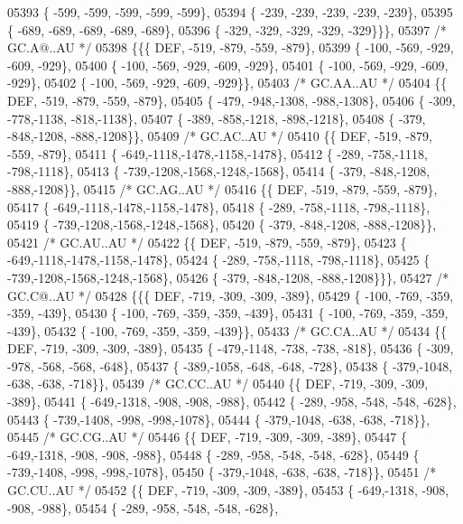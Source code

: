 \begin{DoxyCode}
05393 \{ -599, -599, -599, -599, -599\},
05394 \{ -239, -239, -239, -239, -239\},
05395 \{ -689, -689, -689, -689, -689\},
05396 \{ -329, -329, -329, -329, -329\}\}\},
05397 \textcolor{comment}{/* GC.A@..AU */}
05398 \{\{\{  DEF, -519, -879, -559, -879\},
05399 \{ -100, -569, -929, -609, -929\},
05400 \{ -100, -569, -929, -609, -929\},
05401 \{ -100, -569, -929, -609, -929\},
05402 \{ -100, -569, -929, -609, -929\}\},
05403 \textcolor{comment}{/* GC.AA..AU */}
05404 \{\{  DEF, -519, -879, -559, -879\},
05405 \{ -479, -948,-1308, -988,-1308\},
05406 \{ -309, -778,-1138, -818,-1138\},
05407 \{ -389, -858,-1218, -898,-1218\},
05408 \{ -379, -848,-1208, -888,-1208\}\},
05409 \textcolor{comment}{/* GC.AC..AU */}
05410 \{\{  DEF, -519, -879, -559, -879\},
05411 \{ -649,-1118,-1478,-1158,-1478\},
05412 \{ -289, -758,-1118, -798,-1118\},
05413 \{ -739,-1208,-1568,-1248,-1568\},
05414 \{ -379, -848,-1208, -888,-1208\}\},
05415 \textcolor{comment}{/* GC.AG..AU */}
05416 \{\{  DEF, -519, -879, -559, -879\},
05417 \{ -649,-1118,-1478,-1158,-1478\},
05418 \{ -289, -758,-1118, -798,-1118\},
05419 \{ -739,-1208,-1568,-1248,-1568\},
05420 \{ -379, -848,-1208, -888,-1208\}\},
05421 \textcolor{comment}{/* GC.AU..AU */}
05422 \{\{  DEF, -519, -879, -559, -879\},
05423 \{ -649,-1118,-1478,-1158,-1478\},
05424 \{ -289, -758,-1118, -798,-1118\},
05425 \{ -739,-1208,-1568,-1248,-1568\},
05426 \{ -379, -848,-1208, -888,-1208\}\}\},
05427 \textcolor{comment}{/* GC.C@..AU */}
05428 \{\{\{  DEF, -719, -309, -309, -389\},
05429 \{ -100, -769, -359, -359, -439\},
05430 \{ -100, -769, -359, -359, -439\},
05431 \{ -100, -769, -359, -359, -439\},
05432 \{ -100, -769, -359, -359, -439\}\},
05433 \textcolor{comment}{/* GC.CA..AU */}
05434 \{\{  DEF, -719, -309, -309, -389\},
05435 \{ -479,-1148, -738, -738, -818\},
05436 \{ -309, -978, -568, -568, -648\},
05437 \{ -389,-1058, -648, -648, -728\},
05438 \{ -379,-1048, -638, -638, -718\}\},
05439 \textcolor{comment}{/* GC.CC..AU */}
05440 \{\{  DEF, -719, -309, -309, -389\},
05441 \{ -649,-1318, -908, -908, -988\},
05442 \{ -289, -958, -548, -548, -628\},
05443 \{ -739,-1408, -998, -998,-1078\},
05444 \{ -379,-1048, -638, -638, -718\}\},
05445 \textcolor{comment}{/* GC.CG..AU */}
05446 \{\{  DEF, -719, -309, -309, -389\},
05447 \{ -649,-1318, -908, -908, -988\},
05448 \{ -289, -958, -548, -548, -628\},
05449 \{ -739,-1408, -998, -998,-1078\},
05450 \{ -379,-1048, -638, -638, -718\}\},
05451 \textcolor{comment}{/* GC.CU..AU */}
05452 \{\{  DEF, -719, -309, -309, -389\},
05453 \{ -649,-1318, -908, -908, -988\},
05454 \{ -289, -958, -548, -548, -628\},

\end{DoxyCode}
